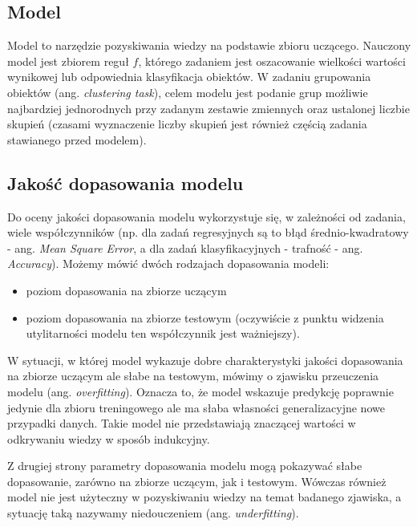 \documentclass[
]{book}
\providecommand{\tightlist}{%
  \setlength{\itemsep}{0pt}\setlength{\parskip}{0pt}}
\theoremstyle{plain}
\theoremstyle{definition}
\theoremstyle{definition}
\theoremstyle{definition}
\theoremstyle{definition}
\theoremstyle{definition}
\theoremstyle{remark}
\begin{document}
\subsection{Model}\label{model}

Model to narzędzie pozyskiwania wiedzy na podstawie zbioru uczącego. Nauczony model jest zbiorem reguł \(f\), którego zadaniem jest oszacowanie wielkości wartości wynikowej lub odpowiednia klasyfikacja obiektów. W zadaniu grupowania obiektów (ang. \emph{clustering task}), celem modelu jest podanie grup możliwie najbardziej jednorodnych przy zadanym zestawie zmiennych oraz ustalonej liczbie skupień (czasami wyznaczenie liczby skupień jest również częścią zadania stawianego przed modelem).

\subsection{Jakość dopasowania modelu}\label{jakoux15bux107-dopasowania-modelu}

Do oceny jakości dopasowania modelu wykorzystuje się, w zależności od zadania, wiele współczynników (np. dla zadań regresyjnych są to błąd średnio-kwadratowy - ang. \emph{Mean Square Error}, a dla zadań klasyfikacyjnych - trafność - ang. \emph{Accuracy}). Możemy mówić dwóch rodzajach dopasowania modeli:

\begin{itemize}
\tightlist
\item
  poziom dopasowania na zbiorze uczącym
\item
  poziom dopasowania na zbiorze testowym (oczywiście z punktu widzenia utylitarności modelu ten współczynnik jest ważniejszy).
\end{itemize}

W sytuacji, w której model wykazuje dobre charakterystyki jakości dopasowania na zbiorze uczącym ale słabe na testowym, mówimy o zjawisku przeuczenia modelu (ang. \emph{overfitting}). Oznacza to, że model wskazuje predykcję poprawnie jedynie dla zbioru treningowego ale ma słaba własności generalizacyjne nowe przypadki danych. Takie model nie przedstawiają znaczącej wartości w odkrywaniu wiedzy w sposób indukcyjny.

Z drugiej strony parametry dopasowania modelu mogą pokazywać słabe dopasowanie, zarówno na zbiorze uczącym, jak i testowym. Wówczas również model nie jest użyteczny w pozyskiwaniu wiedzy na temat badanego zjawiska, a sytuację taką nazywamy niedouczeniem (ang. \emph{underfitting}).
\end{document}
